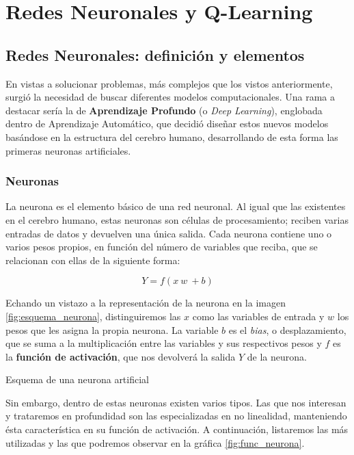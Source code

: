 \chapter{Redes Neuronales y Q-Learning}
\label{cap:deepLearning}


\section{Redes Neuronales: definición y elementos}
En vistas a solucionar problemas, más complejos que los vistos anteriormente, surgió la necesidad de buscar diferentes modelos computacionales. Una rama a destacar sería la de \textbf{Aprendizaje Profundo} (o \textit{Deep Learning}), englobada dentro de Aprendizaje Automático, que decidió diseñar estos nuevos modelos basándose en la estructura del cerebro humano, desarrollando de esta forma las primeras neuronas artificiales.

\subsection{Neuronas}
La neurona es el elemento básico de una red neuronal. Al igual que las existentes en el cerebro humano, estas neuronas son células de procesamiento; reciben varias entradas de datos y devuelven una única salida. Cada neurona contiene uno o varios pesos propios, en función del número de variables que reciba, que se relacionan con ellas de la siguiente forma:

$$Y = f(x\ w\ + b)$$

Echando un vistazo a la representación de la neurona en la imagen \ref{fig:esquema_neurona}, distinguiremos las $x$ como las variables de entrada y $w$ los pesos que les asigna la propia neurona. La variable $b$ es el \textit{bias}, o desplazamiento, que se suma a la multiplicación entre las variables y sus respectivos pesos y $f$ es la \textbf{función de activación}, que nos devolverá la salida $Y$ de la neurona.

%
       {Esquema de una neurona artificial}

Sin embargo, dentro de estas neuronas existen varios tipos. Las que nos interesan y trataremos en profundidad son las especializadas en no linealidad, manteniendo ésta característica en su función de activación. A continuación, listaremos las más utilizadas y las que podremos observar en la gráfica \ref{fig:func_neurona}.

